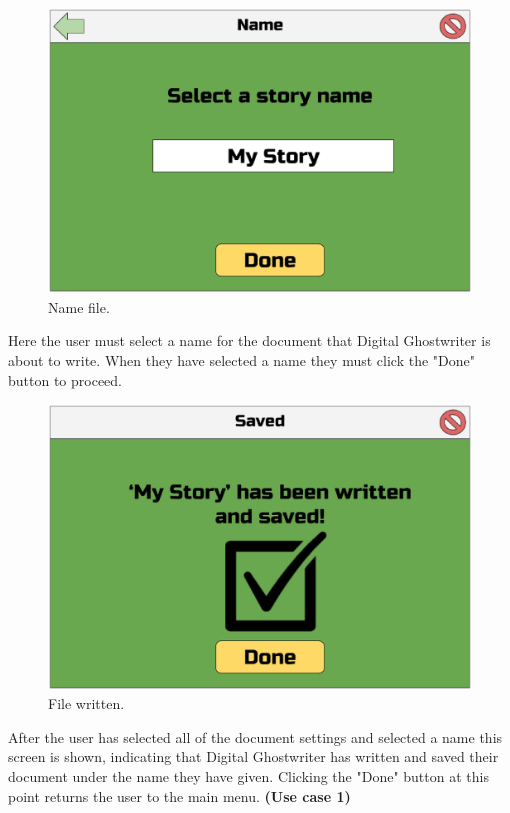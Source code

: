 \documentclass[12pt]{article}
\begin{document}
\begin{figure}[ht]
  \centering
    \includegraphics[scale=0.5]{W2.eps}
    \caption{Name file.}
\end{figure}

Here the user must select a name for the document that Digital Ghostwriter is about to write. When they have selected a name they must click the "Done" button to proceed.

\newpage

\begin{figure}[ht]
  \centering
    \includegraphics[scale=0.5]{W3.eps}
    \caption{File written.}
\end{figure}

After the user has selected all of the document settings and selected a name this screen is shown, indicating that Digital Ghostwriter has written and saved their document under the name they have given. Clicking the "Done" button at this point returns the user to the main menu. \newline \textbf{(Use case 1)}
\end{document}
